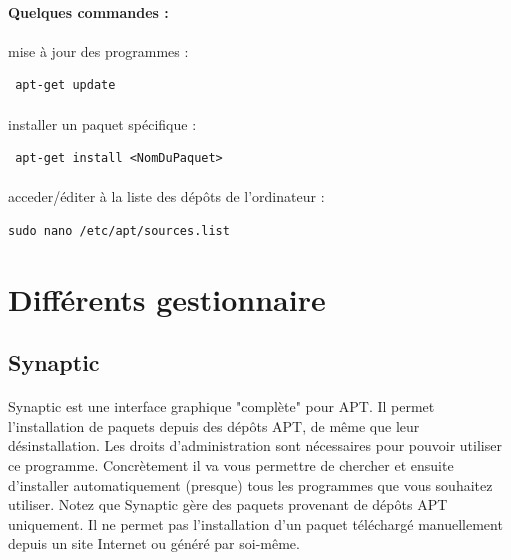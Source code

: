 \documentclass[a4paper,12pt]{article}
\begin{document}
\paragraph{Quelques commandes : }
\paragraph{}
mise à jour des programmes :
\begin{verbatim}
 apt-get update
\end{verbatim}
\paragraph{}
installer un  paquet spécifique :
\begin{verbatim}
 apt-get install <NomDuPaquet>
\end{verbatim}
\paragraph{}
acceder/éditer à la liste des dépôts de l'ordinateur :
\begin{verbatim}
sudo nano /etc/apt/sources.list
\end{verbatim}



\section{Différents gestionnaire}
\subsection{Synaptic}
\paragraph{}
Synaptic est une interface graphique "complète" pour APT. Il permet l'installation de paquets depuis des dépôts APT, de même que leur désinstallation. Les droits d'administration sont nécessaires pour pouvoir utiliser ce programme.
Concrètement il va vous permettre de chercher et ensuite d'installer automatiquement (presque) tous les programmes que vous souhaitez utiliser. Notez que Synaptic gère des paquets ​provenant de dépôts APT uniquement. Il ne permet ​pas
l'​installation d'un paquet téléchargé manuellement depuis un site Internet ou généré par soi-même. ​
\end{document}
